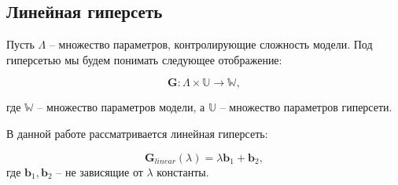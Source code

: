 \documentclass[12pt, twoside]{article}
\begin{document}
\subsection{Линейная гиперсеть}

Пусть $\Lambda$ --  множество параметров, контролирующие сложность модели. Под гиперсетью мы будем понимать следующее отображение:

\begin{equation}
	\mathbf{G} : \Lambda \times \mathbb{U} \rightarrow \mathbb{W},
\end{equation}

где $\mathbb{W}$ -- множество параметров модели, а $\mathbb{U}$ -- множество параметров гиперсети.

 В данной работе рассматривается линейная гиперсеть:
 
 \begin{equation}
 \mathbf{G}_{linear}(\lambda) = \lambda \mathbf{b}_1 + \mathbf{b}_2,
 \end{equation}
 где $\mathbf{b}_1, \mathbf{b}_2$ -- не зависящие от $\lambda$ константы.


\end{document}
